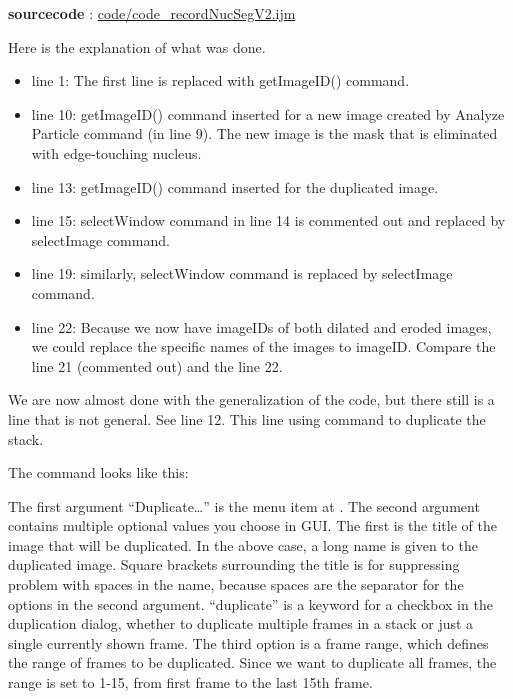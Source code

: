 \textbf{sourcecode} : \href{http://www.example.com/contents}{code/code\_recordNucSegV2.ijm}

Here is the explanation of what was done.

\begin{itemize}
  \item line 1: The first line is replaced with getImageID() command. 
  \item line 10: getImageID() command inserted for a new image created by Analyze Particle command (in line 9). The new image is the mask that is eliminated with edge-touching nucleus. 
  \item line 13: getImageID() command inserted for the duplicated image. 
  \item line 15: selectWindow command in line 14 is commented out and replaced by selectImage command. 
  \item line 19: similarly, selectWindow command is replaced by selectImage command. 
  \item line 22: Because we now have imageIDs of both dilated and eroded images, we could replace the specific names of the images to imageID. Compare the line 21 (commented out) and the line 22. 

\end{itemize}

We are now almost done with the generalization of the code, but there still is a line that is not general. See line 12. This line using  command to duplicate the stack.

The command looks like this:


The first argument ``Duplicate\ldots'' is the menu item at . The second argument contains multiple optional values you choose in GUI. The first is the title of the image that will be duplicated. In the above case, a long name is given to the duplicated image. Square brackets surrounding the title is for suppressing problem with spaces in the name, because spaces are the separator for the options in the second argument. ``duplicate'' is a keyword for a checkbox in the duplication dialog, whether to duplicate multiple frames in a stack or just a single currently shown frame. The third option is a frame range, which defines the range of frames to be duplicated. Since we want to duplicate all frames, the range is set to 1-15, from first frame to the last 15th frame.

